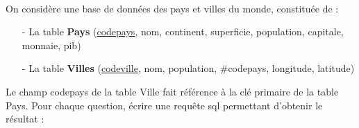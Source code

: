 \documentclass[11pt,a4paper]{article}
\begin{document}
\begin{Exercise}[title = {Quelques requêtes {\sc sql}}]\\
	On considère une base de données des pays et villes du monde, constituée de :
	\begin{itemize}
		\item[-] La table \textbf{Pays} (\underline{codepays}, nom, continent, superficie, population, capitale, monnaie, pib)
		\item[-] La table \textbf{Villes} (\underline{codeville}, nom, population, \#codepays, longitude, latitude)
	\end{itemize}
	Le champ codepays de la table Ville fait référence à la clé primaire de la table Pays. Pour chaque question, écrire une requête {\sc sql} permettant d'obtenir le résultat :
\end{Exercise}
\end{document}
